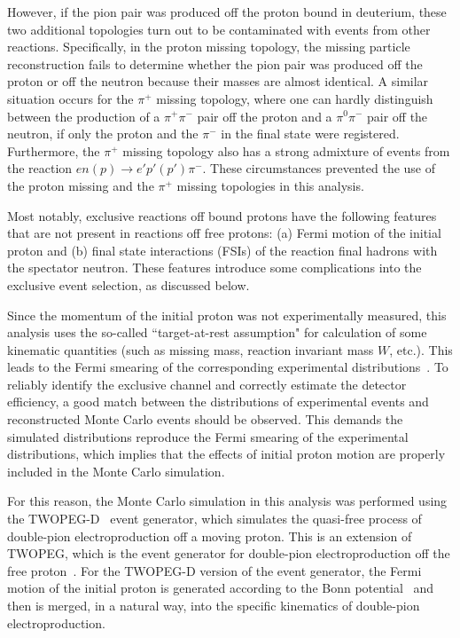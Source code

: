 \documentclass[prc,twocolumn,superscriptaddress,showpacs,amssymb,amsmath,amsfonts,aps,nofootinbib]{revtex4-1}
\begin{document}
However, if the pion pair was produced off the proton bound in deuterium, these two additional topologies turn out to be contaminated with events from other reactions. Specifically, in the proton missing topology, the missing particle reconstruction fails to determine whether the pion pair was produced off the proton or off the neutron because their masses are almost identical. A similar situation occurs for the $\pi^+$ missing topology, where one can hardly distinguish between the production of a $\pi^{+}\pi^{-}$ pair off the proton and a $\pi^{0}\pi^{-}$ pair off the neutron, if only the proton and the $\pi^{-}$ in the final state were registered. Furthermore, the $\pi^+$ missing topology also has a strong admixture of events from the reaction $en(p)\rightarrow e'p'(p')\pi^{-}$. These circumstances prevented the use of the proton missing and the $\pi^{+}$ missing topologies in this analysis.



Most notably, exclusive reactions off bound protons have the following features that are not present in reactions off free protons: (a) Fermi motion of the initial proton and (b) final state interactions (FSIs) of the reaction final hadrons with the spectator neutron. These features introduce some complications into the exclusive event selection, as discussed below.



Since the momentum of the initial proton was not experimentally measured, this analysis uses the so-called ``target-at-rest assumption" for calculation of some kinematic quantities (such as missing mass, reaction invariant mass $W$, etc.). This leads to the Fermi smearing of the corresponding experimental distributions~\cite{Skorodumina:2015rea}. To reliably identify the exclusive channel and correctly estimate the detector efficiency, a good match between the distributions of experimental events and reconstructed Monte Carlo events should be observed. This demands the simulated distributions reproduce the Fermi smearing of the experimental distributions, which implies that the effects of initial proton motion are properly included in the Monte Carlo simulation.






For this reason, the Monte Carlo simulation in this analysis was performed using the TWOPEG-D~\cite{twopeg-d} event generator, which simulates the quasi-free process of double-pion electroproduction off a moving proton. This is an extension of TWOPEG, which is the event generator for double-pion electroproduction off the free proton~\cite{twopeg}. For the TWOPEG-D version of the event generator, the Fermi motion of the initial proton is generated according to the Bonn potential~\cite{Machleidt:1987hj} and then is merged, in a natural way, into the specific kinematics of double-pion electroproduction.
\end{document}
